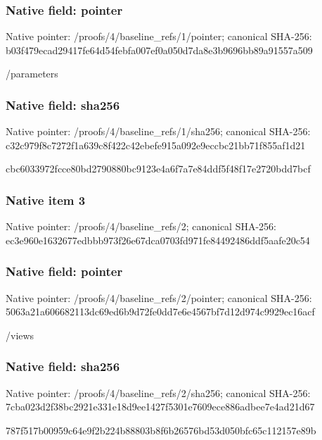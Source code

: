 \documentclass[10pt,a4paper]{article}
\begin{document}
\subsubsection{Native field: pointer}
Native pointer: /proofs/4/baseline\_\allowbreak{}refs/1/pointer; canonical SHA-256: b03f479ecad29417fe64d54febfa007ef0a050d7da8e3b9696bb89a91557a509

\begingroup\raggedright\sloppy /\allowbreak{}parameters\par\endgroup

\subsubsection{Native field: sha256}
Native pointer: /proofs/4/baseline\_\allowbreak{}refs/1/sha256; canonical SHA-256: c32c979f8c7272f1a639c8f422c42ebefe915a092e9eccbc21bb71f855af1d21

\begingroup\raggedright\sloppy cbc6033972fcce80bd2790880bc9123e4a6f7a7e84ddf5f48f17e2720bdd7bcf\par\endgroup

\subsubsection{Native item 3}
Native pointer: /proofs/4/baseline\_\allowbreak{}refs/2; canonical SHA-256: ec3e960e1632677edbbb973f26e67dca0703fd971fe84492486ddf5aafe20c54

\subsubsection{Native field: pointer}
Native pointer: /proofs/4/baseline\_\allowbreak{}refs/2/pointer; canonical SHA-256: 5063a21a606682113dc69ed6b9d72fe0dd7e6e4567bf7d12d974c9929ec16acf

\begingroup\raggedright\sloppy /\allowbreak{}views\par\endgroup

\subsubsection{Native field: sha256}
Native pointer: /proofs/4/baseline\_\allowbreak{}refs/2/sha256; canonical SHA-256: 7cba023d2f38bc2921e331e18d9ee1427f5301e7609ece886adbee7e4ad21d67

\begingroup\raggedright\sloppy 787f517b00959c64e9f2b224b88803b8f6b26576bd53d050bfc65c112157e89b\par\endgroup
\end{document}
